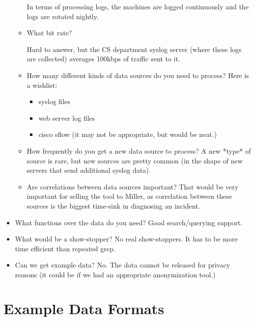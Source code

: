 \documentclass{article}
\begin{document}
\begin{itemize}
\begin{itemize}
In terms of processing logs, the machines are logged continuously and
the logs are rotated nightly.

\item What bit rate?

Hard to answer, but the CS department 
syslog server (where these logs are collected) 
averages 100kbps of traffic sent to it. 

\item How many different kinds of data sources do you need to process?
Here is a wishlist:
\begin{itemize}
\item syslog files
\item web server log files
\item cisco sflow   (it may
                     not be appropriate, but would be neat.) 
\end{itemize}

\item How frequently do you get a new data source to process?
 A new *type* of source is rare, but new sources are pretty common 
(in the shape of new servers that send additional syslog data). 

\item Are correlations between data sources important?
That would be very important for selling the tool to Miller, 
as correlation between these sources is the biggest time-sink in 
diagnosing an incident.

\end{itemize}  

\item What functions over the data do you need?  Good search/querying 
support. 

\item What would be a show-stopper?  No real show-stoppers.  It has to
be more time efficient than repeated grep.

\item Can we get example data?  No.  The data cannot be released for 
privacy reasons (it could be if we had an appropriate anonymization tool.)

\end{itemize}



{

}

\appendix

\section{Example Data Formats}
\label{sec:example formats}
\end{document}
